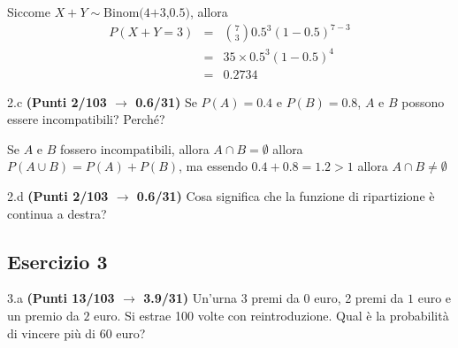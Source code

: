 \documentclass[
  11pt,
]{book}
\theoremstyle{mytheoremstyle}
\theoremstyle{mydefstyle}
\newenvironment{sol}
  {
  \begin{tcolorbox}[enhanced,breakable,arc=0.1mm,boxrule=1pt,colback=white,colframe=iblue,
  title=\bf \fontfamily{lmss}\selectfont \hspace{.5 cm} Soluzione,drop fuzzy shadow]

}{
\end{tcolorbox}
  }
\begin{document}
\begin{sol}
Siccome \(X+Y\sim\text{Binom(4+3,0.5)}\), allora
\normalsize 
\begin{eqnarray*}
      P( X+Y = 3 ) &=& \binom{ 7 }{ 3 } 0.5 ^{ 3 }(1- 0.5 )^{ 7 - 3 } \\                 &=& 35 \times 0.5 ^{ 3 }(1- 0.5 )^{ 4 } \\                 &=& 0.2734 
   \end{eqnarray*}
\normalsize 

\end{sol}

2.c \textbf{(Punti 2/103 \(\rightarrow\) 0.6/31)} Se \(P(A)=0.4\) e \(P(B)=0.8\), \(A\) e \(B\) possono essere incompatibili? Perché?

\begin{sol}
Se \(A\) e \(B\) fossero incompatibili, allora \(A\cap B=\emptyset\) allora \(P(A\cup B)=P(A)+P(B)\), ma essendo \(0.4+0.8=1.2>1\) allora \(A\cap B\neq\emptyset\)

\end{sol}

2.d \textbf{(Punti 2/103 \(\rightarrow\) 0.6/31)} Cosa significa che la funzione di ripartizione è continua a destra?

\subsection{Esercizio 3}\label{esercizio-3-33}

3.a \textbf{(Punti 13/103 \(\rightarrow\) 3.9/31)} Un'urna 3 premi da \(\mbox{0}\) euro, 2 premi da \(\mbox{1}\) euro e un premio da \(\mbox{2}\) euro.
Si estrae 100 volte con reintroduzione.
Qual è la probabilità di vincere più di 60 euro?
\end{document}
